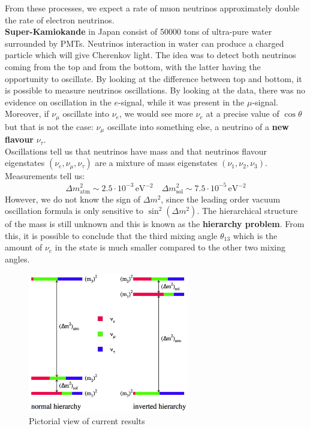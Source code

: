 \documentclass[10.75pt,a4paper,openright,bottom=2cm]{article}
\begin{document}
From these processes, we expect a rate of muon neutrinos approximately double the rate of electron neutrinos.\\
\textbf{Super-Kamiokande} in Japan consist of 50000 tons of ultra-pure water surrounded by PMTs. Neutrinos interaction in water can produce a charged particle which will give Cherenkov light. The idea was to detect both neutrinos coming from the top and from the bottom, with the latter having the opportunity to oscillate. By looking at the difference between top and bottom, it is possible to measure neutrinos oscillations. By looking at the data, there was no evidence on oscillation in the $e$-signal, while it was present in the $\mu$-signal. Moreover, if $\nu_\mu$ oscillate into $\nu_e$, we would see more $\nu_e$ at a precise value of $\cos\theta$ but that is not the case: $\nu_\mu$ oscillate into something else, a neutrino of a \textbf{new flavour} $\nu_\tau$.\\
Oscillations tell us that neutrinos have mass and that neutrinos flavour eigenstates $(\nu_e,\nu_\mu,\nu_\tau)$ are a mixture of mass eigenstates $(\nu_1,\nu_2,\nu_3)$. Measurements tell us:
\[
\Delta m^2_{\text{atm}}\sim2.5\cdot10^{-3}\,\text{eV$^{-2}$} \quad \Delta m^2_{\text{sol}}\sim7.5\cdot10^{-5}\,\text{eV$^{-2}$}
\]
However, we do not know the sign of $\Delta m^2$, since the leading order vacuum oscillation formula is only sensitive to $\sin^2(\Delta m^2)$.
The hierarchical structure of the mass is still unknown and this is known as the \textbf{hierarchy problem}. From this, it is possible to conclude that the third mixing angle $\theta_{13}$ which is the amount of $\nu_e$ in the  state is much smaller compared to the other two mixing angles.
\begin{figure}[h]
    \centering
    \includegraphics[width=7cm,height=6.125cm]{hierarchy2.jpg}
    \caption{Pictorial view of current results}
    \label{hierarchy}
\end{figure}\\
\end{document}
